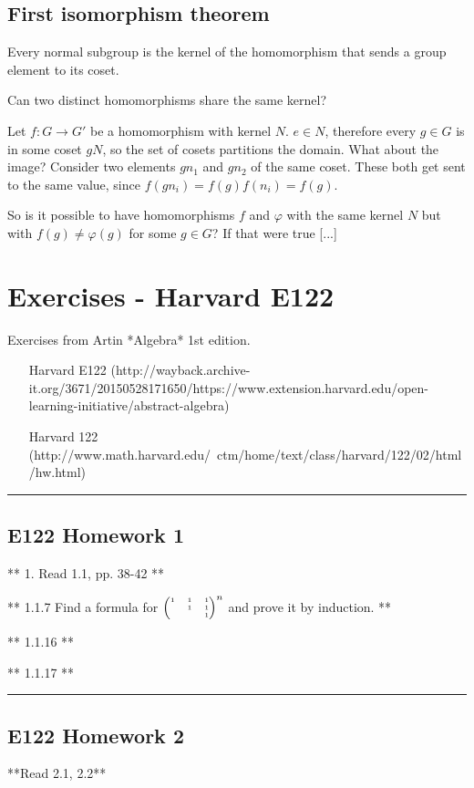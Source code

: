 \newpage
\subsection{First isomorphism theorem}


Every normal subgroup is the kernel of the homomorphism that sends a group element to its coset.

Can two distinct homomorphisms share the same kernel?

Let $f: G \rightarrow G'$ be a homomorphism with kernel $N$. $e \in N$,
therefore every $g \in G$ is in some coset $gN$, so the set of cosets
partitions the domain. What about the image? Consider two elements $gn_1$ and
$gn_2$ of the same coset. These both get sent to the same value, since
$f(gn_i) = f(g)f(n_i) = f(g)$.

So is it possible to have homomorphisms $f$ and $\varphi$ with the same kernel
$N$ but with $f(g) \neq \varphi(g)$ for some $g \in G$? If that were true [...]
\section{Exercises - Harvard E122}
Exercises from Artin *Algebra* 1st edition.

\begin{itemize}
\item [Harvard E122](http://wayback.archive-it.org/3671/20150528171650/https://www.extension.harvard.edu/open-learning-initiative/abstract-algebra)
\item [Harvard 122](http://www.math.harvard.edu/~ctm/home/text/class/harvard/122/02/html/hw.html)
\end{itemize}

\hrule

\subsection{E122 Homework 1}

** 1. Read 1.1, pp. 38-42 **

** 1.1.7 Find a formula for $\tiny{\begin{pmatrix}1 & 1 & 1\\  & 1 & 1\\  &   & 1\\ \end{pmatrix}}^n$ and prove it by induction. **

** 1.1.16 **

** 1.1.17 **

\hrule
\subsection{E122 Homework 2}
**Read 2.1, 2.2**

